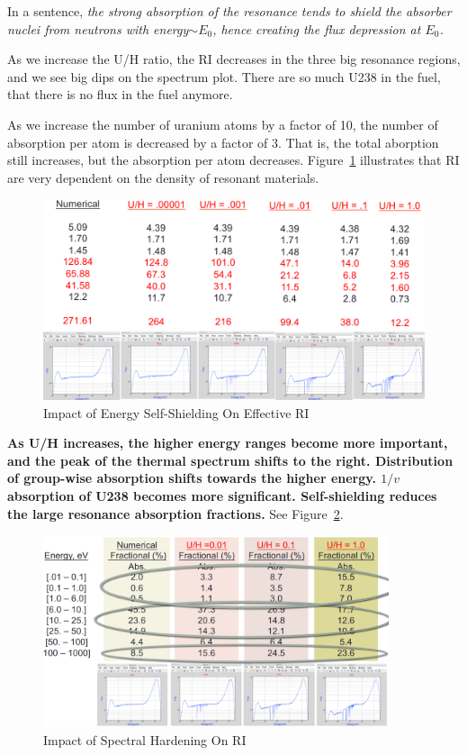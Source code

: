 \documentclass{school-22.211-notes}
\begin{document}
In a sentence, \textit{the strong absorption of the resonance tends to shield the absorber nuclei from neutrons with energy$\sim E_0$, hence creating the flux depression at $E_0$.}

As we increase the U/H ratio, the RI decreases in the three big resonance regions, and we see big dips on the spectrum plot. There are so much U238 in the fuel, that there is no flux in the fuel anymore. 

As we increase the number of uranium atoms by a factor of 10, the number of absorption per atom is decreased by a factor of 3. That is, the total aborption still increases, but the absorption per atom decreases. Figure~\ref{energy-self-shielding} illustrates that RI are very dependent on the density of resonant materials.
\begin{figure}
  \centering
  \includegraphics[width=4.5in]{images/r-m/self-shielding.png}
  \caption{Impact of Energy Self-Shielding On Effective RI} \label{energy-self-shielding}
\end{figure}



\clearpage
\label{spectral-hardening-section}
\textbf{As U/H increases, the higher energy ranges become more important, and the peak of the thermal spectrum shifts to the right. Distribution of group-wise absorption shifts towards the higher energy. $1/v$ absorption of U238 becomes more significant. Self-shielding reduces the large resonance absorption fractions. } See Figure~\ref{spectral-hardening}. 
\begin{figure}[ht]
  \centering
  \includegraphics[width=4in]{images/r-m/spectral-hardening.png}
  \caption{Impact of Spectral Hardening On RI} \label{spectral-hardening}
\end{figure}
\end{document}
